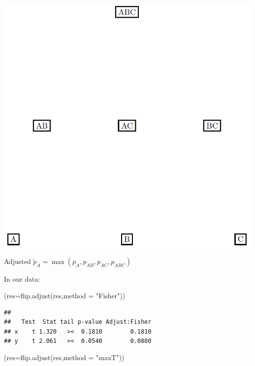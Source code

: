 \documentclass[
]{article}
\newenvironment{Shaded}{\begin{snugshade}}{\end{snugshade}}
\newcommand{\AttributeTok}[1]{\textcolor[rgb]{0.77,0.63,0.00}{#1}}
\newcommand{\FunctionTok}[1]{\textcolor[rgb]{0.00,0.00,0.00}{#1}}
\newcommand{\NormalTok}[1]{#1}
\newcommand{\StringTok}[1]{\textcolor[rgb]{0.31,0.60,0.02}{#1}}
\begin{document}
\begin{center}\includegraphics[width=9.82in]{./figs/closed_set} \end{center}

Adjusted \(\tilde p_A=\max(p_A,p_{AB},p_{AC},p_{ABC})\)

In our data:

\begin{Shaded}
\begin{Highlighting}[]
\NormalTok{(}\AttributeTok{res=}\FunctionTok{flip.adjust}\NormalTok{(res,}\AttributeTok{method =} \StringTok{"Fisher"}\NormalTok{))}
\end{Highlighting}
\end{Shaded}

\begin{verbatim}
## 
##   Test  Stat tail p-value Adjust:Fisher
## x    t 1.320   ><  0.1810        0.1810
## y    t 2.061   ><  0.0540        0.0880
\end{verbatim}

\begin{Shaded}
\begin{Highlighting}[]
\NormalTok{(}\AttributeTok{res=}\FunctionTok{flip.adjust}\NormalTok{(res,}\AttributeTok{method =} \StringTok{"maxT"}\NormalTok{))}
\end{Highlighting}
\end{Shaded}
\end{document}
